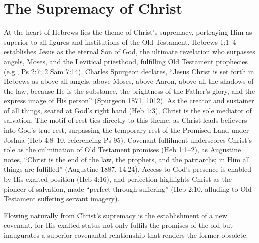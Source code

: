 \documentclass[12pt]{article}
\begin{document}
\section{The Supremacy of Christ}
At the heart of Hebrews lies the theme of Christ’s supremacy, portraying Him as
superior to all figures and institutions of the Old Testament. Hebrews 1:1--4
establishes Jesus as the eternal Son of God, the ultimate revelation who
surpasses angels, Moses, and the Levitical priesthood, fulfilling Old Testament
prophecies (e.g., Ps 2:7; 2 Sam 7:14). Charles Spurgeon declares, ``Jesus
Christ is set forth in Hebrews as above all angels, above Moses, above Aaron,
above all the shadows of the law, because He is the substance, the brightness
of the Father’s glory, and the express image of His person'' (Spurgeon 1871,
1012). As the creator and sustainer of all things, seated at God’s right hand
(Heb 1:3), Christ is the sole mediator of salvation. The motif of rest ties
directly to this theme, as Christ leads believers into God’s true rest,
surpassing the temporary rest of the Promised Land under Joshua (Heb 4:8--10,
referencing Ps 95). Covenant fulfilment underscores Christ’s role as the
culmination of Old Testament promises (Heb 1:1--2), as Augustine notes,
``Christ is the end of the law, the prophets, and the patriarchs; in Him all
things are fulfilled'' (Augustine 1887, 14.24). Access to God’s presence is
enabled by His exalted position (Heb 4:16), and perfection highlights Christ as
the pioneer of salvation, made ``perfect through suffering'' (Heb 2:10,
alluding to Old Testament suffering servant imagery).

Flowing naturally from Christ’s supremacy is the establishment of a new
covenant, for His exalted status not only fulfils the promises of the old but
inaugurates a superior covenantal relationship that renders the former obsolete.
\end{document}
